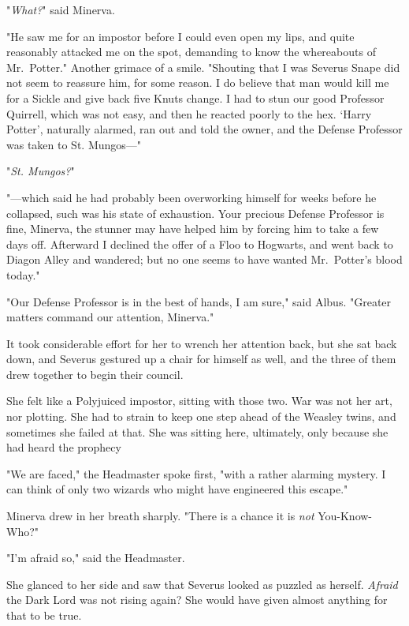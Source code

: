 "\emph{What?}" said Minerva.

"He saw me for an impostor before I could even open my lips, and quite
reasonably attacked me on the spot, demanding to know the whereabouts of
Mr.~Potter." Another grimace of a smile. "Shouting that I was Severus Snape did
not seem to reassure him, for some reason. I do believe that man would kill me
for a Sickle and give back five Knuts change. I had to stun our good Professor
Quirrell, which was not easy, and then he reacted poorly to the hex. `Harry
Potter', naturally alarmed, ran out and told the owner, and the Defense
Professor was taken to St. Mungos---"

"\emph{St. Mungos?}"

"---which said he had probably been overworking himself for weeks before he
collapsed, such was his state of exhaustion. Your precious Defense Professor is
fine, Minerva, the stunner may have helped him by forcing him to take a few
days off. Afterward I declined the offer of a Floo to Hogwarts, and went back
to Diagon Alley and wandered; but no one seems to have wanted Mr.~Potter's
blood today."

"Our Defense Professor is in the best of hands, I am sure," said Albus.
"Greater matters command our attention, Minerva."

It took considerable effort for her to wrench her attention back, but she sat
back down, and Severus gestured up a chair for himself as well, and the three
of them drew together to begin their council.

She felt like a Polyjuiced impostor, sitting with those two. War was not her
art, nor plotting. She had to strain to keep one step ahead of the Weasley
twins, and sometimes she failed at that. She was sitting here, ultimately, only
because she had heard the prophecy{\el}

"We are faced," the Headmaster spoke first, "with a rather alarming mystery. I
can think of only two wizards who might have engineered this escape."

Minerva drew in her breath sharply. "There is a chance it is \emph{not}
You-Know-Who?"

"I'm afraid so," said the Headmaster.

She glanced to her side and saw that Severus looked as puzzled as herself.
\emph{Afraid} the Dark Lord was not rising again? She would have given almost
anything for that to be true.

